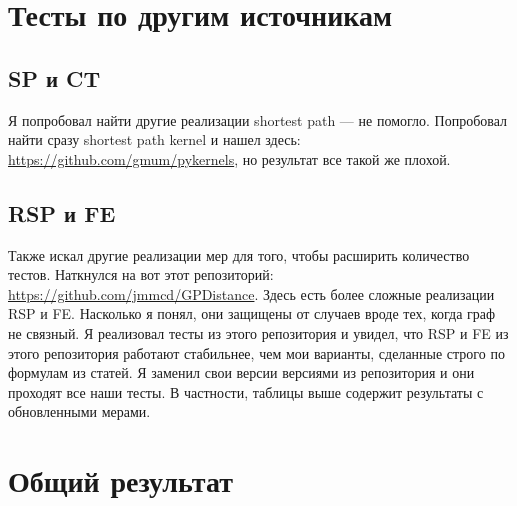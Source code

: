 \documentclass{article}
\begin{document}
\section{Тесты по другим источникам}

\subsection{SP и CT}
Я попробовал найти другие реализации shortest path --- не помогло. Попробовал найти сразу shortest path kernel и нашел здесь: \url{https://github.com/gmum/pykernels}, но результат все такой же плохой.

\subsection{RSP и FE}
Также искал другие реализации мер для того, чтобы расширить количество тестов. Наткнулся на вот этот репозиторий: \url{https://github.com/jmmcd/GPDistance}. Здесь есть более сложные реализации RSP и FE. Насколько я понял, они защищены от случаев вроде тех, когда граф не связный. Я реализовал тесты из этого репозитория и увидел, что RSP и FE из этого репозитория работают стабильнее, чем мои варианты, сделанные строго по формулам из статей. Я заменил свои версии версиями из репозитория и они проходят все наши тесты. В частности, таблицы выше содержит результаты с обновленными мерами.

\section*{Общий результат}
\end{document}
